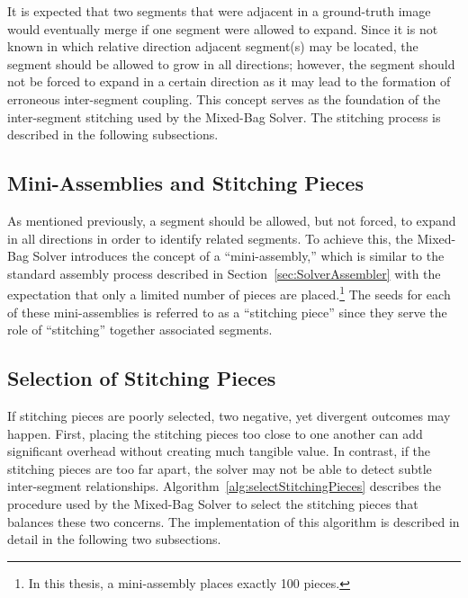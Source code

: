 It is expected that two segments that were adjacent in a ground-truth image would eventually merge if one segment were allowed to expand. Since it is not known in which relative direction adjacent segment(s) may be located, the segment should be allowed to grow in all directions; however, the segment should not be forced to expand in a certain direction as it may lead to the formation of erroneous inter-segment coupling.  This concept serves as the foundation of the inter-segment stitching used by the Mixed-Bag Solver.  The stitching process is described in the following subsections.

\subsection{Mini-Assemblies and Stitching Pieces}

As mentioned previously, a segment should be allowed, but not forced, to expand in all directions in order to identify related segments.  To achieve this, the Mixed-Bag Solver introduces the concept of a ``mini-assembly,'' which is similar to the standard assembly process described in Section~\ref{sec:SolverAssembler} with the expectation that only a limited number of pieces are placed.\footnote{In this thesis, a mini-assembly places exactly 100 pieces.}  The seeds for each of these mini-assemblies is referred to as a ``stitching piece'' since they serve the role of ``stitching'' together associated segments.

\subsection{Selection of Stitching Pieces}\label{sec:stitchingPieceSelection}

If stitching pieces are poorly selected, two negative, yet divergent outcomes may happen.  First, placing the stitching pieces too close to one another can add significant overhead without creating much tangible value.  In contrast, if the stitching pieces are too far apart, the solver may not be able to detect subtle inter-segment relationships.  Algorithm~\ref{alg:selectStitchingPieces} describes the procedure used by the Mixed-Bag Solver to select the stitching pieces that balances these two concerns.  The implementation of this algorithm is described in detail in the following two subsections.

